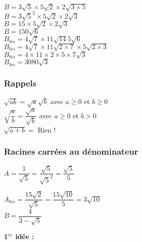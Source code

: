 $ B = 3\sqrt{5} \times 5\sqrt{2} \times 2\sqrt{3 \times 5} $ \\

$ B = 3\sqrt{5}^2 \times 5\sqrt{2} \times 2\sqrt{3} $ \\

$ B = 15 \times 5\sqrt{2} \times 2\sqrt{3} $ \\

$ B = 150\sqrt{6} $ \\

$ B_{bis} = 4\sqrt{7} \times 11\sqrt{14} 5\sqrt{6} $ \\

$ B_{bis} =4\sqrt{7} \times 11\sqrt{2\times7} \times 5\sqrt{2\times3} $ \\

$ B_{bis} = 4 \times 11 \times 2 \times 5 \times 7\sqrt{3} $ \\

$ B_{bis} = 3080\sqrt{3} $

\subsubsection*{Rappels}

$ \sqrt{ab} = \sqrt{a}\sqrt{b} $ avec $ a \geqslant 0 $ et $ b \geqslant 0 $ \\

$ \sqrt{\dfrac{a}{b}} = \dfrac{\sqrt{a}}{\sqrt{b}} $ avec $ a \geqslant 0 $ et $ b > 0 $ \\

$ \sqrt{a + b} = $ Rien !

\newpage

\subsubsection{Racines carrées au dénominateur}

$ A = \dfrac{1}{\sqrt{5}} = \dfrac{\sqrt{5}}{\sqrt{5}^2} = \dfrac{\sqrt{5}}{5} $ \\

\vspace{0,2cm}

$ A_{bis} = \dfrac{15\sqrt{2}}{\sqrt{5}} = \dfrac{15\sqrt{10}}{5} = 3\sqrt{10} $ \\

$ B = \dfrac{4}{3-\sqrt{5}} $ \\

\vspace{1cm}

\textbf{1$^{re}$ idée :} \\


